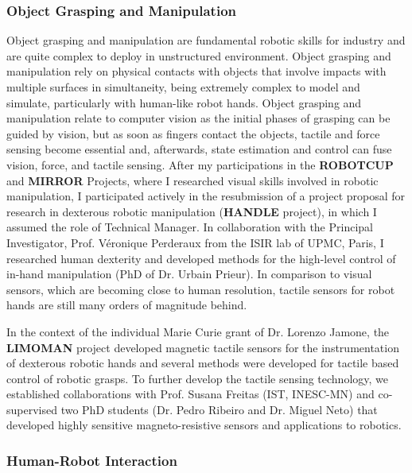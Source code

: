 \subsubsection{Object Grasping and
Manipulation}\label{object-grasping-and-manipulation}

Object grasping and manipulation are fundamental robotic skills for
industry and are quite complex to deploy in unstructured environment.
Object grasping and manipulation rely on physical contacts with objects
that involve impacts with multiple surfaces in simultaneity, being
extremely complex to model and simulate, particularly with human-like
robot hands. Object grasping and manipulation relate to computer vision
as the initial phases of grasping can be guided by vision, but as soon
as fingers contact the objects, tactile and force sensing become
essential and, afterwards, state estimation and control can fuse vision,
force, and tactile sensing. After my participations in the
\textbf{ROBOTCUP} and \textbf{MIRROR} Projects, where I researched
visual skills involved in robotic manipulation, I participated actively
in the resubmission of a project proposal for research in dexterous
robotic manipulation (\textbf{HANDLE} project), in which I assumed the
role of Technical Manager. In collaboration with the Principal
Investigator, Prof. Véronique Perderaux from the ISIR lab of UPMC,
Paris, I researched human dexterity and developed methods for the
high-level control of in-hand manipulation (PhD of Dr. Urbain Prieur).
In comparison to visual sensors, which are becoming close to human
resolution, tactile sensors for robot hands are still many orders of
magnitude behind.

In the context of the individual Marie Curie grant of Dr. Lorenzo
Jamone, the \textbf{LIMOMAN} project developed magnetic tactile sensors
for the instrumentation of dexterous robotic hands and several methods
were developed for tactile based control of robotic grasps. To further
develop the tactile sensing technology, we established collaborations
with Prof. Susana Freitas (IST, INESC-MN) and co-supervised two PhD
students (Dr. Pedro Ribeiro and Dr. Miguel Neto) that developed highly
sensitive magneto-resistive sensors and applications to robotics.

\subsubsection{Human-Robot Interaction}\label{human-robot-interaction}

